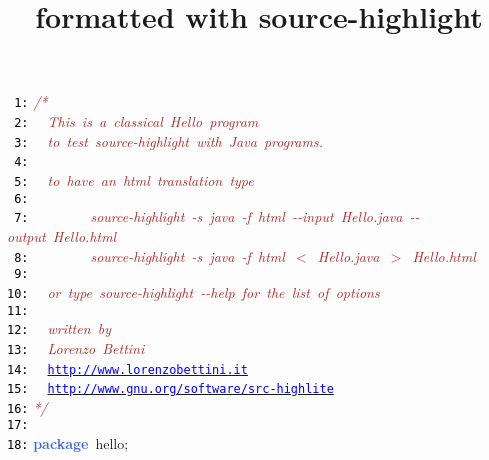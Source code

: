 \documentclass{article}
\title{formatted with source-highlight}
\date{}
\begin{document}
\maketitle
\noindent
\mbox{}\texttt{\textcolor{Black}{ 1:}} \textit{\textcolor{Brown}{/*}} \\
\mbox{}\texttt{\textcolor{Black}{ 2:}} \textit{\textcolor{Brown}{\ \ This\ is\ a\ classical\ Hello\ program}} \\
\mbox{}\texttt{\textcolor{Black}{ 3:}} \textit{\textcolor{Brown}{\ \ to\ test\ source-highlight\ with\ Java\ programs.}} \\
\mbox{}\texttt{\textcolor{Black}{ 4:}} \textit{\textcolor{Brown}{\ \ }} \\
\mbox{}\texttt{\textcolor{Black}{ 5:}} \textit{\textcolor{Brown}{\ \ to\ have\ an\ html\ translation\ type}} \\
\mbox{}\texttt{\textcolor{Black}{ 6:}}  \\
\mbox{}\texttt{\textcolor{Black}{ 7:}} \textit{\textcolor{Brown}{\ \ \ \ \ \ \ \ source-highlight\ -s\ java\ -f\ html\ -\/-input\ Hello.java\ -\/-output\ Hello.html}} \\
\mbox{}\texttt{\textcolor{Black}{ 8:}} \textit{\textcolor{Brown}{\ \ \ \ \ \ \ \ source-highlight\ -s\ java\ -f\ html\ $<$\ Hello.java\ $>$\ Hello.html}} \\
\mbox{}\texttt{\textcolor{Black}{ 9:}}  \\
\mbox{}\texttt{\textcolor{Black}{10:}} \textit{\textcolor{Brown}{\ \ or\ type\ source-highlight\ -\/-help\ for\ the\ list\ of\ options}} \\
\mbox{}\texttt{\textcolor{Black}{11:}}  \\
\mbox{}\texttt{\textcolor{Black}{12:}} \textit{\textcolor{Brown}{\ \ written\ by}} \\
\mbox{}\texttt{\textcolor{Black}{13:}} \textit{\textcolor{Brown}{\ \ Lorenzo\ Bettini}} \\
\mbox{}\texttt{\textcolor{Black}{14:}} \textit{\textcolor{Brown}{\ \ }}\underline{\texttt{\textcolor{Blue}{http://www.lorenzobettini.it}}} \\
\mbox{}\texttt{\textcolor{Black}{15:}} \textit{\textcolor{Brown}{\ \ }}\underline{\texttt{\textcolor{Blue}{http://www.gnu.org/software/src-highlite}}} \\
\mbox{}\texttt{\textcolor{Black}{16:}} \textit{\textcolor{Brown}{*/}} \\
\mbox{}\texttt{\textcolor{Black}{17:}}  \\
\mbox{}\texttt{\textcolor{Black}{18:}} \textbf{\textcolor{RoyalBlue}{package}}\ hello\textcolor{BrickRed}{;} \\
\end{document}
